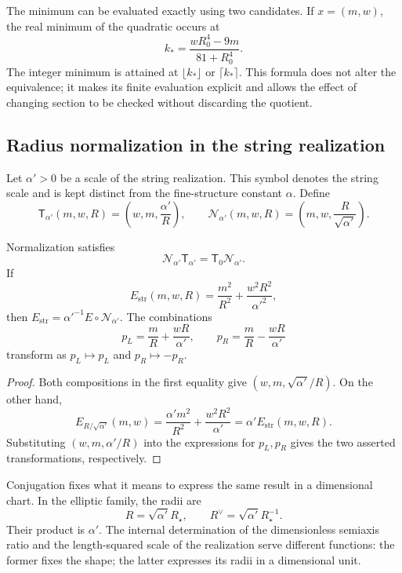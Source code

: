 The minimum can be evaluated exactly using two
candidates. If \(x=(m,w)\), the real minimum of the quadratic
occurs at
\[
 k_* =\frac{wR_0^4-9m}{81+R_0^4}.
\]
The integer minimum is attained at \(\lfloor k_*\rfloor\) or
\(\lceil k_*\rceil\). This formula does not alter the equivalence;
it makes its finite evaluation explicit and allows the effect
of changing section to be checked without discarding the quotient.

\subsection{Radius normalization in the string realization}

Let \(\alpha'>0\) be a scale of the string realization.
This symbol denotes the string scale and is kept distinct
from the fine-structure constant \(\alpha\). Define
\begin{equation}
 \mathsf T_{\alpha'}(m,w,R)
 =\left(w,m,\frac{\alpha'}R\right),\qquad
 \mathcal N_{\alpha'}(m,w,R)
 =\left(m,w,\frac R{\sqrt{\alpha'}}\right).
 \label{iv:iv:eq:normalizacion-cuerda}
\end{equation}

\begin{theorem}
\label{iv:iv:thm:normalizacion-cuerda}
Normalization satisfies
\[
 \mathcal N_{\alpha'}\mathsf T_{\alpha'}
 =\mathsf T_0\mathcal N_{\alpha'}.
\]
If
\[
 E_{\mathrm{str}}(m,w,R)
 =\frac{m^2}{R^2}+\frac{w^2R^2}{\alpha'^2},
\]
then
\(E_{\mathrm{str}}=\alpha'^{-1}E\circ\mathcal N_{\alpha'}\).
The combinations
\[
 p_L=\frac mR+\frac{wR}{\alpha'},\qquad
 p_R=\frac mR-\frac{wR}{\alpha'}
\]
transform as \(p_L\mapsto p_L\) and \(p_R\mapsto-p_R\).
\end{theorem}
\begin{proof}
Both compositions in the first equality give
\((w,m,\sqrt{\alpha'}/R)\). On the other hand,
\[
 E_{R/\sqrt{\alpha'}}(m,w)
 =\frac{\alpha'm^2}{R^2}+\frac{w^2R^2}{\alpha'}
 =\alpha'E_{\mathrm{str}}(m,w,R).
\]
Substituting \((w,m,\alpha'/R)\) into the expressions for
\(p_L,p_R\) gives the two asserted transformations,
respectively.
\end{proof}

Conjugation fixes what it means to express the same result in
a dimensional chart. In the elliptic family, the radii are
\[
 R=\sqrt{\alpha'}R_\star,\qquad
 R^\vee=\sqrt{\alpha'}R_\star^{-1}.
\]
Their product is \(\alpha'\). The internal determination of the
dimensionless semiaxis ratio and the length-squared scale of the
realization serve different functions: the former fixes the shape;
the latter expresses its radii in a dimensional unit.

